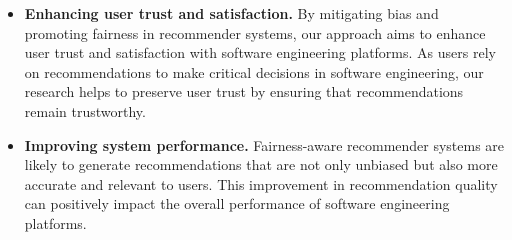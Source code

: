 \begin{itemize}
	\item \textbf{Enhancing user trust and satisfaction.} By mitigating bias and promoting fairness in recommender systems, our approach aims to enhance user trust and satisfaction with software engineering platforms. %
	As users rely on recommendations to make critical decisions in software engineering, our research helps to preserve user trust by ensuring that recommendations remain trustworthy.

	\item \textbf{Improving system performance.} Fairness-aware recommender systems are likely to generate recommendations that are not only unbiased but also more accurate and relevant to users. This improvement in recommendation quality can positively impact the overall performance of software engineering platforms. %

 

\end{itemize}
